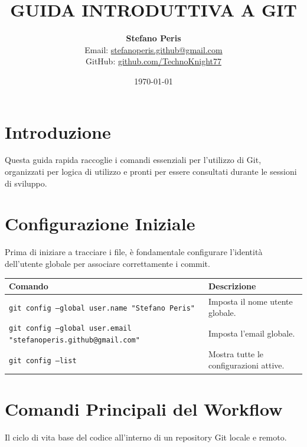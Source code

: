 \documentclass[11pt, a4paper]{article}
\title{\textbf{GUIDA INTRODUTTIVA A GIT}}
\author{\textbf{Stefano Peris} \\ 
\small Email: \href{mailto:stefanoperis.github@gmail.com}{stefanoperis.github@gmail.com} \\
\small GitHub: \href{https://github.com/TechnoKnight77}{github.com/TechnoKnight77}}
\date{\today}
\begin{document}
\maketitle

\section{Introduzione}
Questa guida rapida raccoglie i comandi essenziali per l'utilizzo di Git, organizzati per logica di utilizzo e pronti per essere consultati durante le sessioni di sviluppo.

\section{Configurazione Iniziale}
Prima di iniziare a tracciare i file, è fondamentale configurare l'identità dell'utente globale per associare correttamente i commit.

\begin{center}
\small
\begin{tabular}{ll}
\toprule
\textbf{Comando} & \textbf{Descrizione} \\
\midrule
\texttt{git config --global user.name "Stefano Peris"} & Imposta il nome utente globale. \\
\texttt{git config --global user.email "stefanoperis.github@gmail.com"} & Imposta l'email globale. \\
\texttt{git config --list} & Mostra tutte le configurazioni attive. \\
\bottomrule
\end{tabular}
\end{center}

\section{Comandi Principali del Workflow}
Il ciclo di vita base del codice all'interno di un repository Git locale e remoto.
\end{document}
